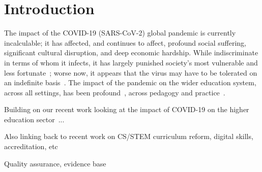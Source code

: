 \documentclass[sigconf]{acmart}
\begin{document}


\maketitle

\section{Introduction}\label{intro}

The impact of the COVID-19 (SARS-CoV-2) global pandemic is currently
incalculable; it has affected, and continues to affect, profound
social suffering, significant cultural disruption, and deep economic
hardship. While indiscriminate in terms of whom it infects, it has
largely punished society’s most vulnerable and less
fortunate~\cite{vonbraun-et-al:2020,lancetcovid:2020}; worse now, it
appears that the virus may have to be tolerated on an indefinite
basis~\cite{kissler-et-al:2020}. The impact of the pandemic on the
wider education system, across all settings, has been
profound~\cite{unescocovidedu:2020,armitage+nellums:2020}, across
pedagogy and practice~\cite{means:2014,doucet-et-al:2020}.

Building on our recent work looking at the impact of COVID-19 on the higher
education sector~\cite{watermeyer-et-al:he2020}...


Also linking back to recent work on CS/STEM curriculum reform, digital
skills, accreditation,
etc~\cite{brown-et-al-toce2014,davenport-et-al:latice2016,murphy-et-al:programming2017,tryfonas+crick:petra2018,crick-et-al:fie2019,davenport-et-al:educon2020,prickett-et-al:iticse2020}

Quality assurance, evidence base~\cite{eefdigtech:2019, eefremote:2020,qaaqands:2020,qaadigtaxonomy:2020}
\end{document}
